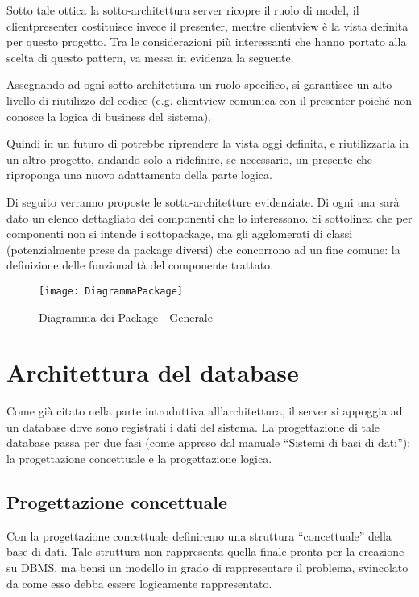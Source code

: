 Sotto tale ottica la sotto-architettura server ricopre il ruolo di model, il clientpresenter costituisce invece il presenter, mentre clientview è la vista definita per questo progetto. Tra le considerazioni più interessanti che hanno portato alla scelta di questo pattern, va messa in evidenza la seguente.

Assegnando ad ogni sotto-architettura un ruolo specifico, si garantisce un alto livello di riutilizzo del codice (e.g. clientview comunica con il presenter poiché non conosce la logica di business del sistema).

Quindi in un futuro di potrebbe riprendere la vista oggi definita, e riutilizzarla in un altro progetto, andando solo a ridefinire, se necessario, un presente che riproponga una nuovo adattamento della parte logica.

Di seguito verranno proposte le sotto-architetture evidenziate. Di ogni una sarà dato un elenco dettagliato dei componenti che lo interessano. Si sottolinea che per componenti non si intende i sottopackage, ma gli agglomerati di classi (potenzialmente prese da package diversi) che concorrono ad un fine comune: la definizione delle funzionalità del componente trattato.
\begin{figure}[H]
\begin{center}
\texttt{[image: DiagrammaPackage]}
\caption{Diagramma dei Package - Generale}\label{fig:package_generale}
\end{center}
\end{figure}


\clearpage

\section{Architettura del database}

Come già citato nella parte introduttiva all'architettura, il server si appoggia ad un database dove sono registrati i dati del sistema. La progettazione di tale database passa per due fasi (come appreso dal manuale ``Sistemi di basi di dati''): la progettazione concettuale e la progettazione logica.

\subsection{Progettazione concettuale}
Con la progettazione concettuale definiremo una struttura ``concettuale'' della base di dati. Tale struttura non rappresenta quella finale pronta per la creazione su DBMS, ma bensi un modello in grado di rappresentare il problema, svincolato da come esso debba essere logicamente rappresentato.

